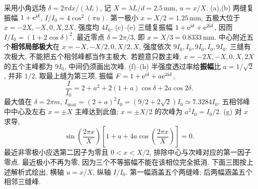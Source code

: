 \begin{solution}
采用小角远场 $\delta=2\pi dx/(\lambda L)$, 记 $X=\lambda L/d=2.5\,\mathrm{mm}$, $u=x/X$.
(a),(b) 两缝复振幅 $1+\mathrm e^{\mathrm i\delta}$, $I/I_0=4\cos^2(\pi u)$. 第一极小 $x=X/2=1.25\,\mathrm{mm}$, 五极大位于 $x=-2X,-X,0,X,2X$, 强度均 $4I_0$.
(c)--(e) 三缝复振幅 $1+\mathrm e^{\mathrm i\delta}+\mathrm e^{2\mathrm i\delta}$, 因而
$I/I_0=(1+2\cos\delta)^2$. 最近零点 $\delta=2\pi/3$, 即 $x=X/3=0.8333\,\mathrm{mm}$. 中心附近五个\textbf{相邻局部极大}在 $x=-X,-X/2,0,X/2,X$, 强度依次 $9I_0,I_0,9I_0,I_0,9I_0$. 三缝有次极大, 不能把五个相邻峰都当作主极大. 若题意只数主峰, $x=-2X,-X,0,X,2X$ 的五个主峰都为 $9I_0$, 中间仍须画出次峰.
(f)--(h) 半强度透过率给\textbf{振幅}比 $a=1/\sqrt2$, 并非 $1/2$. 取最上缝为第三项, 振幅
$F=1+\mathrm e^{\mathrm i\delta}+a\mathrm e^{2\mathrm i\delta}$,
\[
\frac{I}{I_0}=2+a^2+2(1+a)\cos\delta+2a\cos2\delta.
\]
最大值在 $\delta=2\pi m$, $I_{\max}=(2+a)^2I_0=(9/2+2\sqrt2)I_0\simeq7.3284I_0$. 五相邻峰中中心及左右 $x=\pm X$ 主峰达到此值; $x=\pm X/2$ 的次峰为 $a^2I_0=I_0/2$.
(g) 对 $x$ 求导,
\[
\sin\left(\frac{2\pi x}{X}\right)
\left[1+a+4a\cos\left(\frac{2\pi x}{X}\right)\right]=0.
\]
最近非零极小应选第二因子为零且 $0<x<X/2$, 排除中心与次峰对应的第一因子零点. 最近极小不再为零, 因为三个不等振幅不能在该相位完全抵消.
下面三图按上述解析式绘出, 横轴 $u=x/X$, 纵轴 $I/I_0$. 第一幅涵盖五个两缝峰; 后两幅涵盖五个相邻三缝峰.
\begin{center}\par
{}\par
{}\end{center}
\end{solution}

